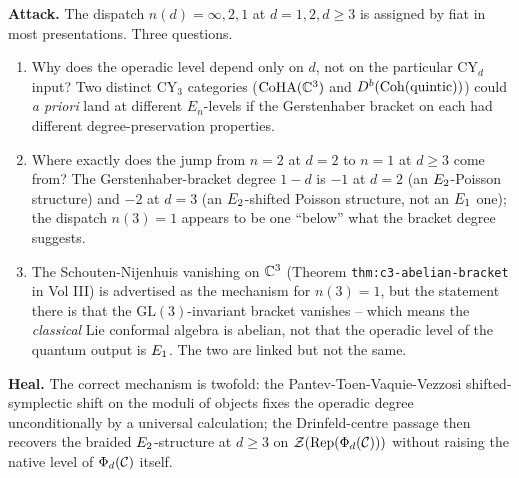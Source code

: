 \textbf{Attack.} The dispatch
$n(d) = \infty, 2, 1$ at $d = 1, 2, d \ge 3$ is assigned by fiat in
most presentations. Three questions.
\begin{enumerate}
\item[Q1.] Why does the operadic level depend only on $d$, not on the
particular CY$_d$ input? Two distinct CY$_3$ categories
($\mathrm{CoHA}(\mathbb{C}^3)$ and $D^b(\mathrm{Coh}(\text{quintic}))$) could \emph{a priori}
land at different $E_n$-levels if the Gerstenhaber bracket on each had
different degree-preservation properties.
\item[Q2.] Where exactly does the jump from $n = 2$ at $d = 2$ to
$n = 1$ at $d \ge 3$ come from? The Gerstenhaber-bracket degree
$1 - d$ is $-1$ at $d = 2$ (an $E_2$-Poisson structure) and $-2$
at $d = 3$ (an $E_2$-shifted Poisson structure, not an $E_1$
one); the dispatch $n(3) = 1$ appears to be one ``below'' what the
bracket degree suggests.
\item[Q3.] The Schouten-Nijenhuis vanishing on $\mathbb{C}^3$ (Theorem
\texttt{thm:c3-abelian-bracket} in Vol III) is advertised as the
mechanism for $n(3) = 1$, but the statement there is that the
$\mathrm{GL}(3)$-invariant bracket vanishes -- which means the
\emph{classical} Lie conformal algebra is abelian, not that the
operadic level of the quantum output is $E_1$. The two are linked
but not the same.
\end{enumerate}

\textbf{Heal.} The correct mechanism is twofold: the Pantev-Toen-Vaquie-Vezzosi
shifted-symplectic shift on the moduli of objects fixes the operadic
degree unconditionally by a universal calculation; the Drinfeld-centre
passage then recovers the braided $E_2$-structure at $d \ge 3$ on
$\mathcal{Z}(\mathrm{Rep}(\Phi_d(\mathcal{C})))$ without raising the native level of
$\Phi_d(\mathcal{C})$ itself.

